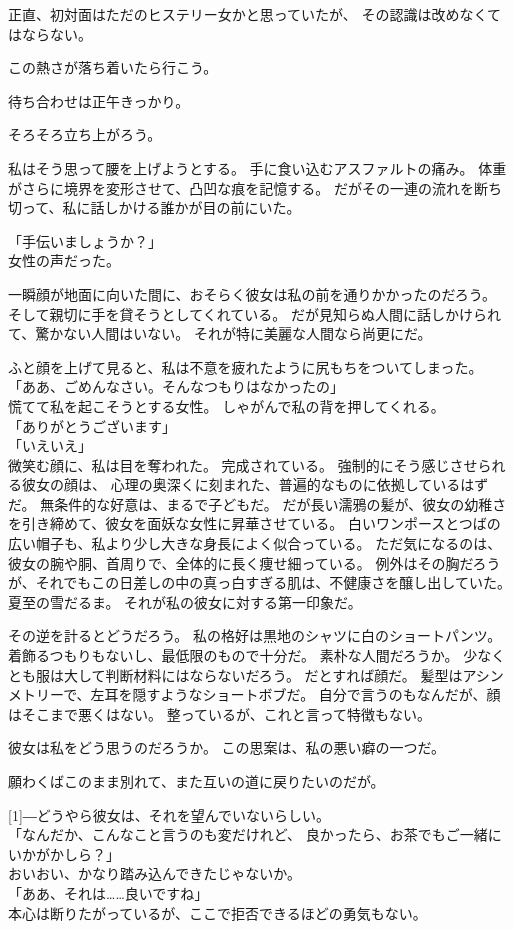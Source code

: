 \documentclass[../HiganMain]{subfiles}
\begin{document}
正直、初対面はただのヒステリー女かと思っていたが、
その認識は改めなくてはならない。

この熱さが落ち着いたら行こう。

待ち合わせは正午きっかり。

そろそろ立ち上がろう。

私はそう思って腰を上げようとする。
手に食い込むアスファルトの痛み。
体重がさらに境界を変形させて、凸凹な痕を記憶する。
だがその一連の流れを断ち切って、私に話しかける誰かが目の前にいた。

「手伝いましょうか？」\\
女性の声だった。

一瞬顔が地面に向いた間に、おそらく彼女は私の前を通りかかったのだろう。
そして親切に手を貸そうとしてくれている。
だが見知らぬ人間に話しかけられて、驚かない人間はいない。
それが特に美麗な人間なら尚更にだ。

ふと顔を上げて見ると、私は不意を疲れたように尻もちをついてしまった。\\

「ああ、ごめんなさい。そんなつもりはなかったの」\\
慌てて私を起こそうとする女性。
しゃがんで私の背を押してくれる。\\
「ありがとうございます」\\
「いえいえ」\\
微笑む顔に、私は目を奪われた。
完成されている。
強制的にそう感じさせられる彼女の顔は、
心理の奥深くに刻まれた、普遍的なものに依拠しているはずだ。
無条件的な好意は、まるで子どもだ。
だが長い濡鴉の髪が、彼女の幼稚さを引き締めて、彼女を面妖な女性に昇華させている。
白いワンポースとつばの広い帽子も、私より少し大きな身長によく似合っている。
ただ気になるのは、彼女の腕や胴、首周りで、全体的に長く痩せ細っている。
例外はその胸だろうが、それでもこの日差しの中の真っ白すぎる肌は、不健康さを醸し出していた。
夏至の雪だるま。
それが私の彼女に対する第一印象だ。

その逆を計るとどうだろう。
私の格好は黒地のシャツに白のショートパンツ。
着飾るつもりもないし、最低限のもので十分だ。
素朴な人間だろうか。
少なくとも服は大して判断材料にはならないだろう。
だとすれば顔だ。
髪型はアシンメトリーで、左耳を隠すようなショートボブだ。
自分で言うのもなんだが、顔はそこまで悪くはない。
整っているが、これと言って特徴もない。

彼女は私をどう思うのだろうか。
この思案は、私の悪い癖の一つだ。

願わくばこのまま別れて、また互いの道に戻りたいのだが。

\scalebox{3}[1]{―}どうやら彼女は、それを望んでいないらしい。\\
「なんだか、こんなこと言うのも変だけれど、
良かったら、お茶でもご一緒にいかがかしら？」\\
おいおい、かなり踏み込んできたじゃないか。\\
「ああ、それは……良いですね」\\
本心は断りたがっているが、ここで拒否できるほどの勇気もない。
\end{document}
